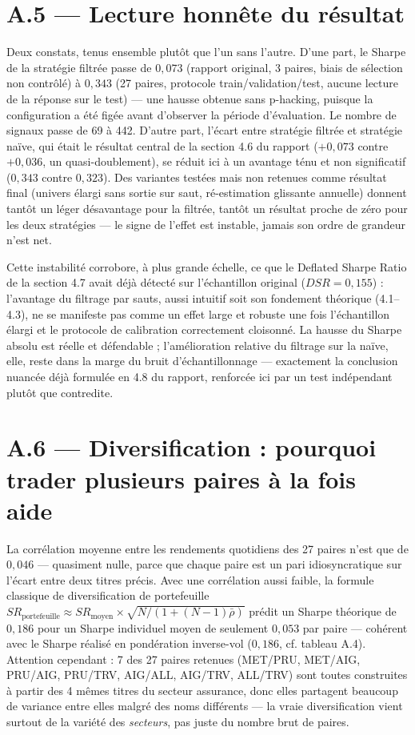 \documentclass{article}
\begin{document}
\section*{A.5 --- Lecture honnête du résultat}
Deux constats, tenus ensemble plutôt que l'un sans l'autre. D'une part, le Sharpe de la stratégie filtrée passe de $0{,}073$ (rapport original, 3 paires, biais de sélection non contrôlé) à $0{,}343$ (27 paires, protocole train/validation/test, aucune lecture de la réponse sur le test) --- une hausse obtenue sans p-hacking, puisque la configuration a été figée avant d'observer la période d'évaluation. Le nombre de signaux passe de 69 à 442. D'autre part, l'écart entre stratégie filtrée et stratégie naïve, qui était le résultat central de la section 4.6 du rapport ($+0{,}073$ contre $+0{,}036$, un quasi-doublement), se réduit ici à un avantage ténu et non significatif ($0{,}343$ contre $0{,}323$). Des variantes testées mais non retenues comme résultat final (univers élargi sans sortie sur saut, ré-estimation glissante annuelle) donnent tantôt un léger désavantage pour la filtrée, tantôt un résultat proche de zéro pour les deux stratégies --- le signe de l'effet est instable, jamais son ordre de grandeur n'est net.

Cette instabilité corrobore, à plus grande échelle, ce que le Deflated Sharpe Ratio de la section 4.7 avait déjà détecté sur l'échantillon original ($DSR=0{,}155$) : l'avantage du filtrage par sauts, aussi intuitif soit son fondement théorique (4.1--4.3), ne se manifeste pas comme un effet large et robuste une fois l'échantillon élargi et le protocole de calibration correctement cloisonné. La hausse du Sharpe absolu est réelle et défendable ; l'amélioration relative du filtrage sur la naïve, elle, reste dans la marge du bruit d'échantillonnage --- exactement la conclusion nuancée déjà formulée en 4.8 du rapport, renforcée ici par un test indépendant plutôt que contredite.

\section*{A.6 --- Diversification : pourquoi trader plusieurs paires à la fois aide}
La corrélation moyenne entre les rendements quotidiens des 27 paires n'est que de $0{,}046$ --- quasiment nulle, parce que chaque paire est un pari idiosyncratique sur l'écart entre deux titres précis. Avec une corrélation aussi faible, la formule classique de diversification de portefeuille $SR_{\text{portefeuille}} \approx SR_{\text{moyen}} \times \sqrt{N/(1+(N-1)\bar\rho)}$ prédit un Sharpe théorique de $0{,}186$ pour un Sharpe individuel moyen de seulement $0{,}053$ par paire --- cohérent avec le Sharpe réalisé en pondération inverse-vol ($0{,}186$, cf. tableau A.4). Attention cependant : 7 des 27 paires retenues (MET/PRU, MET/AIG, PRU/AIG, PRU/TRV, AIG/ALL, AIG/TRV, ALL/TRV) sont toutes construites à partir des 4 mêmes titres du secteur assurance, donc elles partagent beaucoup de variance entre elles malgré des noms différents --- la vraie diversification vient surtout de la variété des \emph{secteurs}, pas juste du nombre brut de paires.
\end{document}
